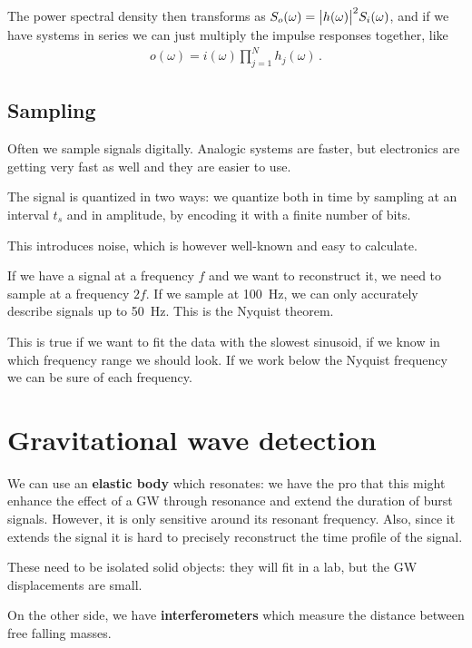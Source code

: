 \documentclass[main.tex]{subfiles}
\begin{document}
The power spectral density then transforms as \(S_o (\omega ) = \abs{h(\omega )}^2 S_i (\omega )\), and if we have systems in series we can just multiply the impulse responses together, like 
%
\begin{align}
o (\omega ) = i(\omega )\prod_{j = 1}^{N} h_j (\omega ) 
\,.
\end{align}


\subsection{Sampling}

Often we sample signals digitally.
Analogic systems are faster, but electronics are getting very fast as well and they are easier to use.

The signal is quantized in two ways: we quantize both in time by sampling at an interval \(t_s\) and in amplitude, by encoding it with a finite number of bits.

This introduces noise, which is however well-known and easy to calculate.

If we have a signal at a frequency \(f\) and we want to reconstruct it, we need to sample at a frequency \(2f\). 
If we sample at \SI{100}{Hz}, we can only accurately describe signals up to \SI{50}{Hz}. 
This is the Nyquist theorem.

This is true if we want to fit the data with the slowest sinusoid, if we know in which frequency range we should look.
If we work below the Nyquist frequency we can be sure of each frequency.

\section{Gravitational wave detection}

We can use an \textbf{elastic body} which resonates: we have the pro that this might enhance the effect of a GW through resonance and extend the duration of burst signals. 
However, it is only sensitive around its resonant frequency. 
Also, since it extends the signal it is hard to precisely reconstruct the time profile of the signal. 

These need to be isolated solid objects: they will fit in a lab, but the GW displacements are small. 

On the other side, we have \textbf{interferometers} which measure the distance between free falling masses. 
\end{document}
